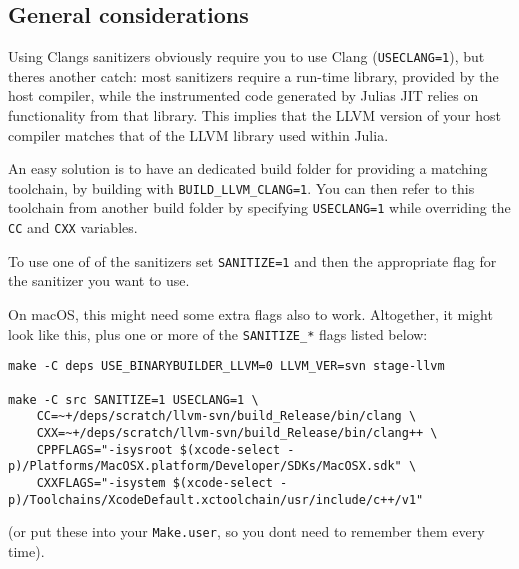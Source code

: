 \hypertarget{527857279218691176}{}


\subsection{General considerations}



Using Clang{\textquotesingle}s sanitizers obviously require you to use Clang (\texttt{USECLANG=1}), but there{\textquotesingle}s another catch: most sanitizers require a run-time library, provided by the host compiler, while the instrumented code generated by Julia{\textquotesingle}s JIT relies on functionality from that library. This implies that the LLVM version of your host compiler matches that of the LLVM library used within Julia.



An easy solution is to have an dedicated build folder for providing a matching toolchain, by building with \texttt{BUILD\_LLVM\_CLANG=1}. You can then refer to this toolchain from another build folder by specifying \texttt{USECLANG=1} while overriding the \texttt{CC} and \texttt{CXX} variables.



To use one of of the sanitizers set \texttt{SANITIZE=1} and then the appropriate flag for the sanitizer you want to use.



On macOS, this might need some extra flags also to work. Altogether, it might look like this, plus one or more of the \texttt{SANITIZE\_*} flags listed below:




\begin{lstlisting}
make -C deps USE_BINARYBUILDER_LLVM=0 LLVM_VER=svn stage-llvm

make -C src SANITIZE=1 USECLANG=1 \
    CC=~+/deps/scratch/llvm-svn/build_Release/bin/clang \
    CXX=~+/deps/scratch/llvm-svn/build_Release/bin/clang++ \
    CPPFLAGS="-isysroot $(xcode-select -p)/Platforms/MacOSX.platform/Developer/SDKs/MacOSX.sdk" \
    CXXFLAGS="-isystem $(xcode-select -p)/Toolchains/XcodeDefault.xctoolchain/usr/include/c++/v1"
\end{lstlisting}



(or put these into your \texttt{Make.user}, so you don{\textquotesingle}t need to remember them every time).



\hypertarget{1061650975116506198}{}


